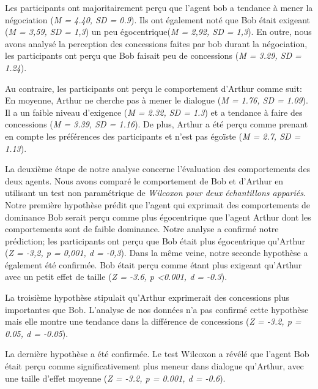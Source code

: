 {			Les participants ont majoritairement perçu que l'agent bob a tendance à mener la négociation (\emph {M = 4.40, SD = 0.9}). Ils ont également noté que Bob était exigeant (\emph {M = 3,59, SD = 1,3}) un peu égocentrique(\emph {M = 2,92, SD = 1,3}). En outre, nous avons analysé la perception des concessions faites par bob durant la négociation, les participants ont perçu que Bob faisait peu de concessions (\emph {M = 3.29, SD = 1.24}).
			
			Au contraire, les participants ont perçu le comportement d'Arthur comme suit: En moyenne, Arthur ne cherche pas à mener le dialogue (\emph {M = 1.76, SD = 1.09}). Il a un faible niveau d'exigence (\emph {M = 2.32, SD = 1.3}) et a tendance à faire des concessions (\emph {M = 3.39, SD = 1.16}). De plus, Arthur a été perçu comme prenant en compte les préférences des participants et n'est pas égoïste (\emph {M = 2.7, SD = 1.13}).
			
			La deuxième étape de notre analyse concerne l'évaluation des comportements des deux agents. Nous avons comparé le comportement de Bob et d'Arthur en utilisant un test non paramétrique de \emph{Wilcoxon pour deux échantillons appariés}. Notre première hypothèse prédit que l'agent qui exprimait des comportements de dominance Bob serait perçu comme plus égocentrique que l'agent Arthur dont les comportements sont de faible dominance. Notre analyse a confirmé notre prédiction; les participants ont perçu que Bob était plus égocentrique qu'Arthur (\emph {Z = -3,2, p = 0,001, d = -0,3}). Dans la même veine, notre seconde hypothèse a également été confirmée. Bob était perçu comme étant plus exigeant qu'Arthur avec un petit effet de taille (\emph {Z = -3.6, p <0.001, d = -0.3}).
			
			La troisième hypothèse stipulait qu'Arthur exprimerait des concessions plus importantes que Bob. L'analyse de nos données n'a pas confirmé cette hypothèse mais elle montre une tendance dans la différence de concessions (\emph {Z = -3.2, p = 0.05, d = -0.05}).
			
			La dernière hypothèse a été confirmée. Le test Wilcoxon a révélé que l'agent Bob était perçu comme significativement plus meneur dans dialogue qu'Arthur, avec une taille d'effet moyenne (\emph {Z = -3.2, p = 0.001, d = -0.6}).
			
}
